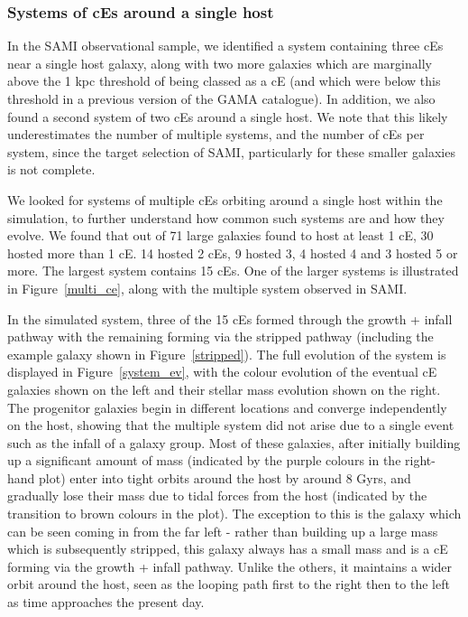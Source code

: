 \documentclass[a4paper,fleqn,usenatbib]{mnras}
\begin{document}
\subsubsection{Systems of cEs around a single host}

In the SAMI observational sample, we identified a system containing three cEs near a single host galaxy, along with two more galaxies which are marginally above the 1 kpc threshold of being classed as a cE (and which were below this threshold in a previous version of the GAMA catalogue). In addition, we also found a second system of two cEs around a single host. We note that this likely underestimates the number of multiple systems, and the number of cEs per system, since the target selection of SAMI, particularly for these smaller galaxies is not complete. 

We looked for systems of multiple cEs orbiting around a single host within the simulation, to further understand how common such systems are and how they evolve. We found that out of 71 large galaxies found to host at least 1 cE, 30 hosted more than 1 cE. 14 hosted 2 cEs, 9 hosted 3, 4 hosted 4 and 3 hosted 5 or more. The largest system contains 15 cEs. One of the larger systems is illustrated in Figure~\ref{multi_ce}, along with the multiple system observed in SAMI. 

In the simulated system, three of the 15 cEs formed through the growth + infall pathway with the remaining forming via the stripped pathway (including the example galaxy shown in Figure~\ref{stripped}). The full evolution of the system is displayed in Figure~\ref{system_ev}, with the colour evolution of the eventual cE galaxies shown on the left and their stellar mass evolution shown on the right. The progenitor galaxies begin in different locations and converge independently on the host, showing that the multiple system did not arise due to a single event such as the infall of a galaxy group. Most of these galaxies, after initially building up a significant amount of mass (indicated by the purple colours in the right-hand plot) enter into tight orbits around the host by around 8 Gyrs, and gradually lose their mass due to tidal forces from the host (indicated by the transition to brown colours in the plot). The exception to this is the galaxy which can be seen coming in from the far left - rather than building up a large mass which is subsequently stripped, this galaxy always has a small mass and is a cE forming via the growth + infall pathway. Unlike the others, it maintains a wider orbit around the host, seen as the looping path first to the right then to the left as time approaches the present day. 
\end{document}
